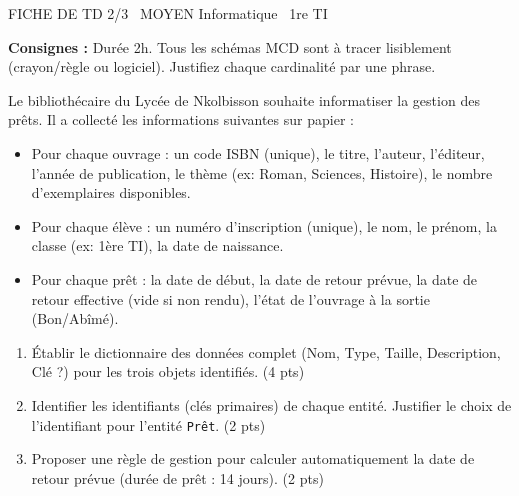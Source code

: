 \documentclass[11pt]{article}
\begin{document}
\begin{tcolorbox}[enhanced,colback=popink,colframe=popink,arc=10pt,boxrule=0pt,left=12pt,right=12pt,top=9pt,bottom=9pt]
{\color{white}\popxbold\small FICHE DE TD 2/3 \textbullet\ MOYEN \hfill Informatique \textbullet\ 1re TI\par}
\end{tcolorbox}
\vspace{4pt}
\noindent\textbf{Consignes :} Durée 2h. Tous les schémas MCD sont à tracer lisiblement (crayon/règle ou logiciel). Justifiez chaque cardinalité par une phrase.

\begin{exercice}
Le bibliothécaire du Lycée de Nkolbisson souhaite informatiser la gestion des prêts. Il a collecté les informations suivantes sur papier :
\begin{itemize}
    \item Pour chaque ouvrage : un code ISBN (unique), le titre, l'auteur, l'éditeur, l'année de publication, le thème (ex: Roman, Sciences, Histoire), le nombre d'exemplaires disponibles.
    \item Pour chaque élève : un numéro d'inscription (unique), le nom, le prénom, la classe (ex: 1ère TI), la date de naissance.
    \item Pour chaque prêt : la date de début, la date de retour prévue, la date de retour effective (vide si non rendu), l'état de l'ouvrage à la sortie (Bon/Abîmé).
\end{itemize}
\begin{enumerate}
    \item Établir le dictionnaire des données complet (Nom, Type, Taille, Description, Clé ?) pour les trois objets identifiés. (4 pts)
    \item Identifier les identifiants (clés primaires) de chaque entité. Justifier le choix de l'identifiant pour l'entité \texttt{Prêt}. (2 pts)
    \item Proposer une règle de gestion pour calculer automatiquement la date de retour prévue (durée de prêt : 14 jours). (2 pts)
\end{enumerate}
\end{exercice}
\end{document}
